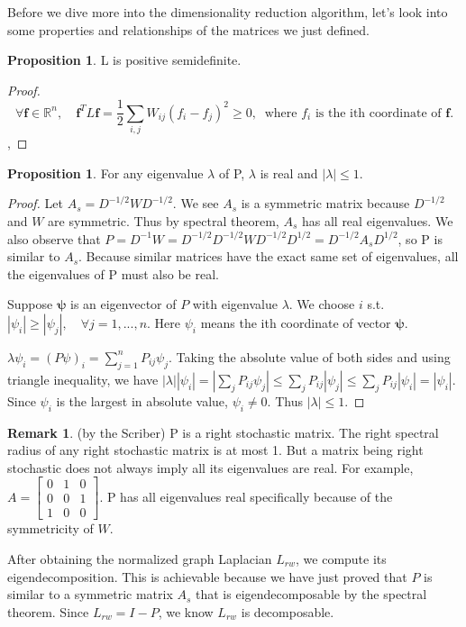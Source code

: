 \documentclass[11pt]{article}
\theoremstyle{definition}
\newtheorem{remark}{Remark}
\newtheorem{prop}[theorem]{Proposition}
\begin{document}
Before we dive more into the dimensionality reduction algorithm, let's look into some properties and relationships of the matrices we just defined.

\begin{prop}
	L is positive semidefinite.
\end{prop}
\begin{proof}
	\[\forall \mathbf{f} \in \mathbb{R}^n,\quad \mathbf{f}^{T}L\mathbf{f} = \frac{1}{2}\sum_{i,j}W_{ij}(f_i - f_j)^2 \geq 0, \;\; \text{where $f_i$ is the ith coordinate of $\mathbf{f}$.}\], 
\end{proof}
\begin{prop}
	For any eigenvalue $\lambda$ of P, $\lambda$ is real and $|\lambda| \leq 1$.
\end{prop}
\begin{proof}
	Let $A_s = D^{-1/2}WD^{-1/2}$. We see $A_s$ is a symmetric matrix because $D^{-1/2}$ and $W$ are symmetric. Thus by spectral theorem, $A_s$ has all real eigenvalues. We also observe that $P = D^{-1}W = D^{-1/2}D^{-1/2}WD^{-1/2}D^{1/2} = D^{-1/2}A_sD^{1/2}$, so P is similar to $A_s$.
	Because similar matrices have the exact same set of eigenvalues, all the eigenvalues of P must also be real.
	
	Suppose $\boldsymbol{\psi}$ is an eigenvector of $P$ with eigenvalue $\lambda$. We choose $i$ s.t. $|\psi_i| \geq |\psi_j|, \quad\forall j = 1, ..., n$. Here $\psi_i$ means the ith coordinate of vector $\boldsymbol{\psi}$.
	
	$\lambda\psi_i = (P\psi)_i = \sum_{j=1}^{n}P_{ij}\psi_j$. Taking the absolute value of both sides and using triangle inequality, we have $|\lambda||\psi_i| = |\sum_{j}P_{ij}\psi_j| \leq \sum_{j}P_{ij}|\psi_j| \leq \sum_{j}P_{ij}|\psi_i| = |\psi_i|$. Since $\psi_i$ is the largest in absolute value, $\psi_i \neq 0$. Thus $|\lambda| \leq 1$.
\end{proof}
\begin{remark} (by the Scriber)
	P is a right stochastic matrix. The right spectral radius of any right stochastic matrix is at most 1. But a matrix being right stochastic does not always imply all its eigenvalues are real. For example, $ A= \begin{bmatrix}
	0 & 1 & 0\\ 0 & 0 & 1\\ 1 & 0 & 0
	\end{bmatrix}$. P has all eigenvalues real specifically because of the symmetricity of $W$.
\end{remark}
After obtaining the normalized graph Laplacian $L_{rw}$, we compute its eigendecomposition. This is achievable because we have just proved that $P$ is similar to a symmetric matrix $A_s$ that is eigendecomposable by the spectral theorem. Since $L_{rw} = I - P$, we know $L_{rw}$ is decomposable.
\end{document}
